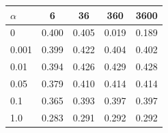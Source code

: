 \begin{tabular}{l c c c c}
\toprule
$\alpha$ & 6 & 36 & 360 & 3600 \\
\midrule
0 & 0.400 & 0.405 & 0.019 & 0.189 \\
0.001 & 0.399 & 0.422 & 0.404 & 0.402 \\
0.01 & 0.394 & 0.426 & 0.429 & 0.428 \\
0.05 & 0.379 & 0.410 & 0.414 & 0.414 \\
0.1 & 0.365 & 0.393 & 0.397 & 0.397 \\
1.0 & 0.283 & 0.291 & 0.292 & 0.292 \\
\bottomrule
\end{tabular}